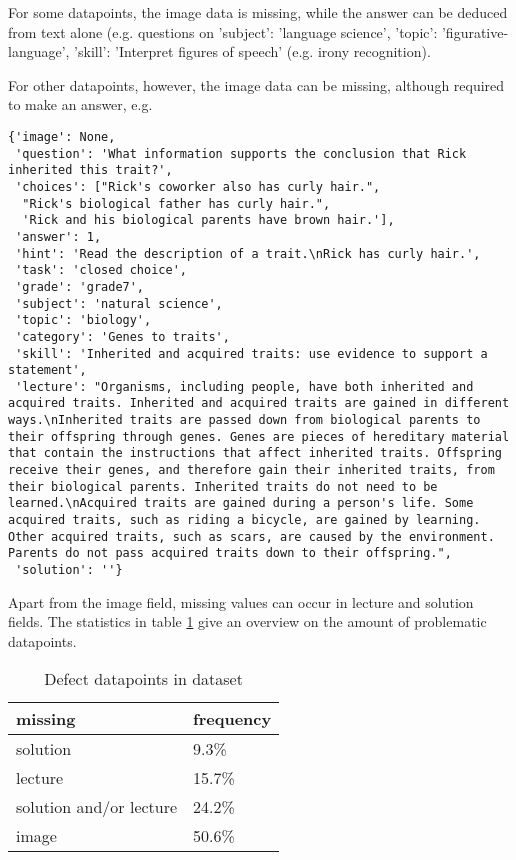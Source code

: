 \documentclass[10pt]{article}
\begin{document}
For some datapoints, the image data is missing, while the answer can be deduced from text alone (e.g. questions on 'subject': 'language science', 'topic': 'figurative-language', 'skill': 'Interpret figures of speech' (e.g. irony recognition). 

For other datapoints, however, the image data can be missing, although required to make an answer, e.g.
\begin{verbatim}
{'image': None,
 'question': 'What information supports the conclusion that Rick inherited this trait?',
 'choices': ["Rick's coworker also has curly hair.",
  "Rick's biological father has curly hair.",
  'Rick and his biological parents have brown hair.'],
 'answer': 1,
 'hint': 'Read the description of a trait.\nRick has curly hair.',
 'task': 'closed choice',
 'grade': 'grade7',
 'subject': 'natural science',
 'topic': 'biology',
 'category': 'Genes to traits',
 'skill': 'Inherited and acquired traits: use evidence to support a statement',
 'lecture': "Organisms, including people, have both inherited and acquired traits. Inherited and acquired traits are gained in different ways.\nInherited traits are passed down from biological parents to their offspring through genes. Genes are pieces of hereditary material that contain the instructions that affect inherited traits. Offspring receive their genes, and therefore gain their inherited traits, from their biological parents. Inherited traits do not need to be learned.\nAcquired traits are gained during a person's life. Some acquired traits, such as riding a bicycle, are gained by learning. Other acquired traits, such as scars, are caused by the environment. Parents do not pass acquired traits down to their offspring.",
 'solution': ''}
\end{verbatim}

Apart from the image field, missing values can occur in lecture and solution fields. The statistics in table \ref{table:dataset-stats} give an overview on the amount of problematic datapoints. 

\begin{table}[h!]
\centering
\begin{tabular}{ll}\toprule
	missing & frequency \\\midrule
	solution & 9.3\% \\
	lecture & 15.7\% \\
	solution and/or lecture & 24.2\% \\
	image & 50.6\%\\\bottomrule
\end{tabular}
\caption{Defect datapoints in dataset}
\label{table:dataset-stats}
\end{table}
\end{document}
